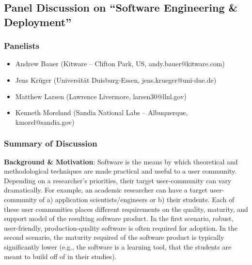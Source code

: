 \subsection{Panel Discussion on ``Software Engineering \& Deployment''}

\subsubsection{Panelists}

\begin{itemize}
\item Andrew Bauer (Kitware -- Clifton Park, US, andy.bauer@kitware.com)
\item Jens Krüger  (Universität Duisburg-Essen, jens.krueger@uni-due.de)
\item Matthew Larsen (Lawrence Livermore, larsen30@llnl.gov)
\item Kenneth Moreland (Sandia National Labs -- Albuquerque, kmorel@sandia.gov)
\end{itemize}

%
%
%
%
%
%

\subsubsection{Summary of Discussion}

\textbf{Background \& Motivation}: Software is the means by which theoretical and methodological techniques are made practical and useful to a user community.  Depending on a researcher’s priorities, their target user-community can vary dramatically.  For example, an academic researcher can have a target user-community of a) application scientists/engineers or b) their students.  Each of these user communities places different requirements on the quality, maturity, and support model of the resulting software product.  In the first scenario, robust, user-friendly, production-quality software is often required for adoption.  In the second scenario, the maturity required of the software product is typically significantly lower (e.g., the software is a learning tool, that the students are meant to build off of in their studies).  

